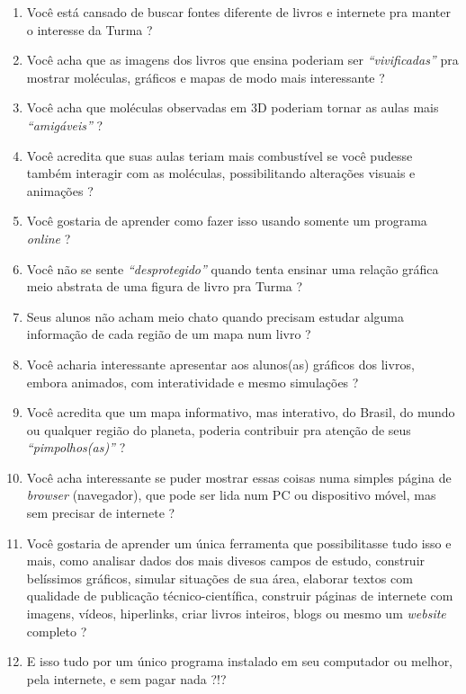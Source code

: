 \documentclass[
  letterpaper,
  DIV=11,
  numbers=noendperiod]{scrreprt}
\providecommand{\tightlist}{%
  \setlength{\itemsep}{0pt}\setlength{\parskip}{0pt}}\usepackage{longtable,booktabs,array}
\begin{document}
\begin{enumerate}
\def\labelenumi{\arabic{enumi}.}
\tightlist
\item
  Você está cansado de buscar fontes diferente de livros e internete pra
  manter o interesse da Turma ?
\item
  Você acha que as imagens dos livros que ensina poderiam ser
  \emph{``vivificadas''} pra mostrar moléculas, gráficos e mapas de modo
  mais interessante ?
\item
  Você acha que moléculas observadas em 3D poderiam tornar as aulas mais
  \emph{``amigáveis''} ?
\item
  Você acredita que suas aulas teriam mais combustível se você pudesse
  também interagir com as moléculas, possibilitando alterações visuais e
  animações ?
\item
  Você gostaria de aprender como fazer isso usando somente um programa
  \emph{online} ?
\item
  Você não se sente \emph{``desprotegido''} quando tenta ensinar uma
  relação gráfica meio abstrata de uma figura de livro pra Turma ?
\item
  Seus alunos não acham meio chato quando precisam estudar alguma
  informação de cada região de um mapa num livro ?
\item
  Você acharia interessante apresentar aos alunos(as) gráficos dos
  livros, embora animados, com interatividade e mesmo simulações ?
\item
  Você acredita que um mapa informativo, mas interativo, do Brasil, do
  mundo ou qualquer região do planeta, poderia contribuir pra atenção de
  seus \emph{``pimpolhos(as)''} ?
\item
  Você acha interessante se puder mostrar essas coisas numa simples
  página de \emph{browser} (navegador), que pode ser lida num PC ou
  dispositivo móvel, mas sem precisar de internete ?
\item
  Você gostaria de aprender um única ferramenta que possibilitasse tudo
  isso e mais, como analisar dados dos mais divesos campos de estudo,
  construir belíssimos gráficos, simular situações de sua área, elaborar
  textos com qualidade de publicação técnico-científica, construir
  páginas de internete com imagens, vídeos, hiperlinks, criar livros
  inteiros, blogs ou mesmo um \emph{website} completo ?
\item
  E isso tudo por um único programa instalado em seu computador ou
  melhor, pela internete, e sem pagar nada ?!?
\end{enumerate}
\end{document}
